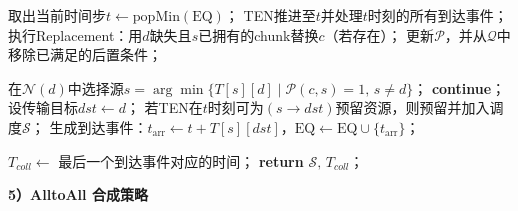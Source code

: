\begin{center}
\begin{algorithm}[h]
    \caption{AllGather的事件驱动贪心合成过程}
    \label{Algorithm-FTACAS-AllGather}
    \begin{algorithmic}[1]

            \STATE 取出当前时间步$t\leftarrow \mathrm{popMin}(\mathrm{EQ})$；
            \STATE TEN推进至$t$并处理$t$时刻的所有到达事件；
                    \STATE 执行Replacement：用$d$缺失且$s$已拥有的chunk替换$c$（若存在）；
                \ENDIF
                \STATE 更新$\mathcal{P}$，并从$\mathcal{Q}$中移除已满足的后置条件；
            \ENDFOR

                \STATE 在$\mathcal{N}(d)$中选择源$s=\arg\min\{T[s][d]\mid \mathcal{P}(c,s)=1,\,s\neq d\}$；
                    \STATE \textbf{continue}；
                \ENDIF
                \STATE 设传输目标$dst\leftarrow d$；
                \STATE 若TEN在$t$时刻可为$(s\rightarrow dst)$预留资源，则预留并加入调度$\mathcal{S}$；
                    \STATE 生成到达事件：$t_{\mathrm{arr}}\leftarrow t+T[s][dst]$，$\mathrm{EQ}\leftarrow \mathrm{EQ}\cup\{t_{\mathrm{arr}}\}$；
                \ENDIF
            \ENDFOR
        \ENDWHILE

        \STATE $T_{coll}\leftarrow$ 最后一个到达事件对应的时间；
        \STATE \textbf{return} $\mathcal{S},\,T_{coll}$；
    \end{algorithmic}
\end{algorithm}
\end{center}
\clearpage



\noindent\quad\textbf{5）AlltoAll 合成策略}

